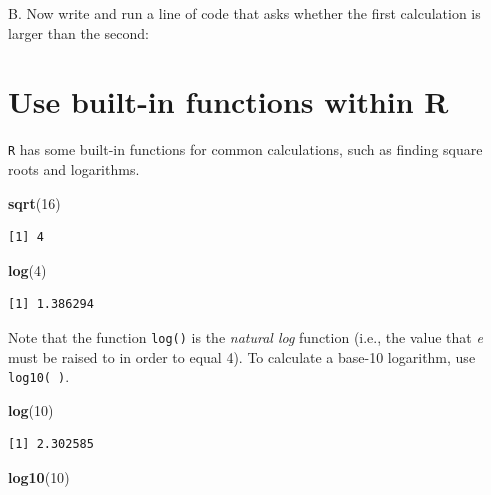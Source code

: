 \documentclass[
]{book}
\newenvironment{Shaded}{\begin{snugshade}}{\end{snugshade}}
\newcommand{\DecValTok}[1]{\textcolor[rgb]{0.00,0.00,0.81}{#1}}
\newcommand{\KeywordTok}[1]{\textcolor[rgb]{0.13,0.29,0.53}{\textbf{#1}}}
\newcommand{\NormalTok}[1]{#1}
\begin{document}
B. Now write and run a line of code that asks whether the first calculation is larger than the second:

\hypertarget{use-built-in-functions-within-r}{%
\section{Use built-in functions within R}\label{use-built-in-functions-within-r}}

\texttt{R} has some built-in functions for common calculations, such as finding square roots and logarithms.

\begin{Shaded}
\begin{Highlighting}[]
\KeywordTok{sqrt}\NormalTok{(}\DecValTok{16}\NormalTok{)}
\end{Highlighting}
\end{Shaded}

\begin{verbatim}
[1] 4
\end{verbatim}

\begin{Shaded}
\begin{Highlighting}[]
\KeywordTok{log}\NormalTok{(}\DecValTok{4}\NormalTok{)}
\end{Highlighting}
\end{Shaded}

\begin{verbatim}
[1] 1.386294
\end{verbatim}

Note that the function \texttt{log()} is the \emph{natural log} function (i.e., the value that \emph{e} must be raised to in order to equal 4). To calculate a base-10 logarithm, use \texttt{log10(\ )}.

\begin{Shaded}
\begin{Highlighting}[]
\KeywordTok{log}\NormalTok{(}\DecValTok{10}\NormalTok{)}
\end{Highlighting}
\end{Shaded}

\begin{verbatim}
[1] 2.302585
\end{verbatim}

\begin{Shaded}
\begin{Highlighting}[]
\KeywordTok{log10}\NormalTok{(}\DecValTok{10}\NormalTok{)}
\end{Highlighting}
\end{Shaded}
\end{document}

